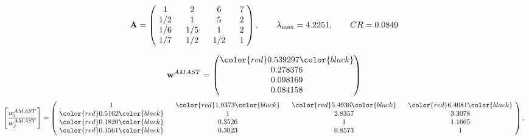 \begin{example}
\begin{equation*}
\mathbf{A} =
\begin{pmatrix}
$\,\,$ 1 $\,\,$ & $\,\,$2$\,\,$ & $\,\,$6$\,\,$ & $\,\,$7 $\,\,$ \\
$\,\,$ 1/2$\,\,$ & $\,\,$ 1 $\,\,$ & $\,\,$5$\,\,$ & $\,\,$2 $\,\,$ \\
$\,\,$ 1/6$\,\,$ & $\,\,$ 1/5$\,\,$ & $\,\,$ 1 $\,\,$ & $\,\,$2 $\,\,$ \\
$\,\,$ 1/7$\,\,$ & $\,\,$ 1/2$\,\,$ & $\,\,$ 1/2$\,\,$ & $\,\,$ 1  $\,\,$ \\
\end{pmatrix},
\qquad
\lambda_{\max} =
4.2251,
\qquad
CR = 0.0849
\end{equation*}

\begin{equation*}
\mathbf{w}^{AMAST} =
\begin{pmatrix}
\color{red} 0.539297\color{black} \\
0.278376\\
0.098169\\
0.084158
\end{pmatrix}\end{equation*}
\begin{equation*}
\left[ \frac{{w}^{AMAST}_i}{{w}^{AMAST}_j} \right] =
\begin{pmatrix}
$\,\,$ 1 $\,\,$ & $\,\,$\color{red} 1.9373\color{black} $\,\,$ & $\,\,$\color{red} 5.4936\color{black} $\,\,$ & $\,\,$\color{red} 6.4081\color{black} $\,\,$ \\
$\,\,$\color{red} 0.5162\color{black} $\,\,$ & $\,\,$ 1 $\,\,$ & $\,\,$2.8357$\,\,$ & $\,\,$3.3078  $\,\,$ \\
$\,\,$\color{red} 0.1820\color{black} $\,\,$ & $\,\,$0.3526$\,\,$ & $\,\,$ 1 $\,\,$ & $\,\,$1.1665 $\,\,$ \\
$\,\,$\color{red} 0.1561\color{black} $\,\,$ & $\,\,$0.3023$\,\,$ & $\,\,$0.8573$\,\,$ & $\,\,$ 1  $\,\,$ \\
\end{pmatrix},
\end{equation*}


\end{example}
